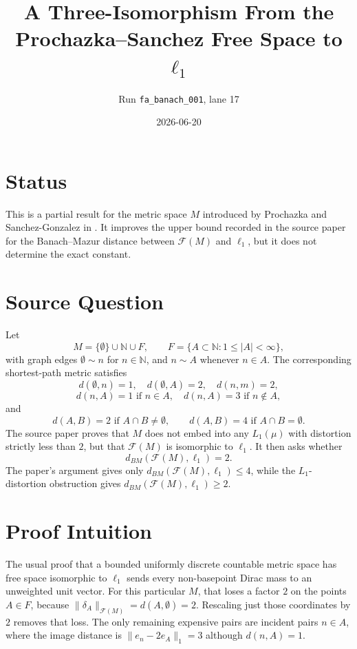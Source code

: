 \documentclass[11pt]{article}
\title{A Three-Isomorphism From the Prochazka--Sanchez Free Space to \texorpdfstring{$\ell_1$}{ell1}}
\author{Run \texttt{fa\_banach\_001}, lane 17}
\date{2026-06-20}
\newcommand{\F}{\mathcal F}
\newcommand{\N}{\mathbb N}
\begin{document}
\maketitle

\section*{Status}

This is a partial result for the metric space \(M\) introduced by
Prochazka and Sanchez-Gonzalez in \cite{PSG}.  It improves the upper
bound recorded in the source paper for the Banach--Mazur distance
between \(\F(M)\) and \(\ell_1\), but it does not determine the exact
constant.

\section*{Source Question}

Let
\[
M=\{\emptyset\}\cup \N \cup F,\qquad
F=\{A\subset \N:1\le |A|<\infty\},
\]
with graph edges \(\emptyset\sim n\) for \(n\in\N\), and \(n\sim A\)
whenever \(n\in A\).  The corresponding shortest-path metric satisfies
\[
d(\emptyset,n)=1,\quad d(\emptyset,A)=2,\quad d(n,m)=2,
\]
\[
d(n,A)=1 \text{ if }n\in A,\quad d(n,A)=3\text{ if }n\notin A,
\]
and
\[
d(A,B)=2 \text{ if }A\cap B\ne\emptyset,\qquad
d(A,B)=4 \text{ if }A\cap B=\emptyset.
\]
The source paper proves that \(M\) does not embed into any \(L_1(\mu)\)
with distortion strictly less than \(2\), but that \(\F(M)\) is
isomorphic to \(\ell_1\).  It then asks whether
\[
d_{BM}(\F(M),\ell_1)=2.
\]
The paper's argument gives only \(d_{BM}(\F(M),\ell_1)\le 4\), while
the \(L_1\)-distortion obstruction gives \(d_{BM}(\F(M),\ell_1)\ge 2\).

\section*{Proof Intuition}

The usual proof that a bounded uniformly discrete countable metric
space has free space isomorphic to \(\ell_1\) sends every non-basepoint
Dirac mass to an unweighted unit vector.  For this particular \(M\),
that loses a factor \(2\) on the points \(A\in F\), because
\(\|\delta_A\|_{\F(M)}=d(A,\emptyset)=2\).  Rescaling just those
coordinates by \(2\) removes that loss.  The only remaining expensive
pairs are incident pairs \(n\in A\), where the image distance is
\(\|e_n-2e_A\|_1=3\) although \(d(n,A)=1\).
\end{document}
